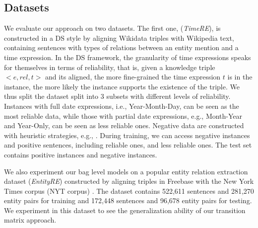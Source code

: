 \subsection{Datasets}
We evaluate our approach on two datasets. 
The first one, (\emph{TimeRE}), is %
constructed in a DS style by aligning Wikidata triples with Wikipedia text,  containing  sentences with  types of relations  between an entity mention and a time expression.  In the DS framework,   the granularity of time expressions speaks for themselves in terms of reliability, that is, given a knowledge triple $<e, rel, t>$ and its aligned,  the more fine-grained the time expression $t$ is in the instance, the more likely the instance  supports the existence of the triple.    We thus split the dataset  split into 3 subsets with different levels of reliability. Instances with full date expressions, i.e.,  Year-Month-Day, can be seen as the most reliable data, while those with partial date expressions, e.g., Month-Year and Year-Only, can be seen as less reliable ones.  Negative data are constructed with heuristic strategies, e.g.,  . 
During training, we can access   negative instances and   positive sentences, including  reliable ones,  and  less reliable ones. The test set contains  positive instances and  negative instances.

We also experiment our bag level models on a popular entity relation extraction dataset (\emph{EntityRE}) constructed by aligning triples in Freebase with the New York Times corpus (NYT corpus) \cite{riedel2010modeling}. The dataset contains 522,611 sentences and 281,270 entity pairs for training and  172,448 sentences and 96,678 entity pairs for testing. We experiment  in this dataset to see the generalization ability of our transition matrix approach.



